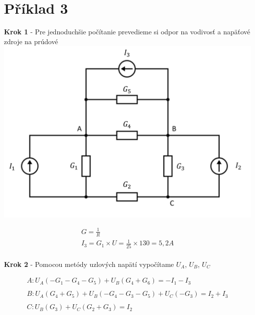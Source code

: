 \section{Příklad 3}

\begin{center}
    \textbf{Krok 1} - Pre jednoduchšie počítanie prevedieme si odpor na vodivosť a napäťové zdroje na prúdové
    \includegraphics[scale=0.5,keepaspectratio]{fig/pr3_1.png} \\
\end{center}

\begin{gather*}
    G = \frac {1} {R} \\
    I_3 = G_1 \times U = \frac {1} {25} \times 130 = 5,2 A \\
\end{gather*}

\newpage

\begin{center}
    \textbf{Krok 2} - Pomocou metódy uzlových napätí vypočítame $U_{A}$, $U_{B}$, $U_{C}$ 
\end{center}

\begin{gather*}
   A:  U_A(-G_1 - G_4 - G_5) + U_B(G_4 + G_6) = -I_1 - I_3 \\\\
   B:  U_A(G_4 + G_5) + U_B(-G_4 - G_3 - G_5) + U_C(-G_3) = I_2 + I_3 \\\\
   C:  U_B(G_3) + U_C(G_2 + G_3) = I_2 \\
\end{gather*}

